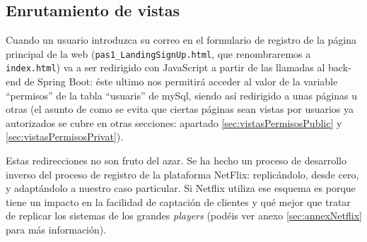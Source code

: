\documentclass[a4paper,12pt]{report}
\begin{document}
	
	
	
	\subsection{Enrutamiento de vistas}
	\label{sec:EnrutamientoDeVistas}
	
	Cuando un usuario introduzca su correo en el formulario de registro de la página principal de la web (\texttt{pas1\_LandingSignUp.html}, que renombraremos a \texttt{index.html}) va a ser redirigido con JavaScript a partir de las llamadas al back-end de Spring Boot: éste ultimo nos permitirá acceder al valor de la variable ``permisos'' de la tabla ``usuaris'' de mySql, siendo así redirigido a unas páginas u otras (el asunto de como se evita que ciertas páginas sean vistas por usuarios ya autorizados se cubre en otras secciones: apartado \ref{sec:vistasPermisosPublic} y \ref{sec:vistasPermisosPrivat}).
	
	

	
	Estas redirecciones no son fruto del azar. Se ha hecho un proceso de desarrollo inverso del proceso de registro de la plataforma NetFlix: replicándolo, desde cero, y adaptándolo a nuestro caso particular. Si Netflix utiliza ese esquema es porque tiene un impacto en la facilidad de captación de clientes y qué mejor que tratar de replicar los sistemas de los grandes \textit{players} (podéis ver anexo \ref{sec:annexNetflix} para más información).
	
	
	
\end{document}
